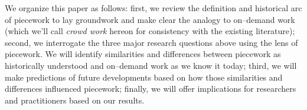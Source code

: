\documentclass[trackingWork]{subfiles}
\begin{document}
We organize this paper as follows:
first, we review the definition and historical arc of piecework
to lay groundwork and make clear the analogy to on--demand work
(which we'll call \textit{crowd work} hereon
for consistency with the existing literature);
second, we interrogate the three major research questions above using the lens of piecework. 
We will identify similarities and differences between piecework as historically understood and
on--demand work as we know it today;
third, we will make predictions of future developments based on how those similarities and differences influenced piecework;
finally, we will offer implications for researchers and practitioners based on our results.


\end{document}
